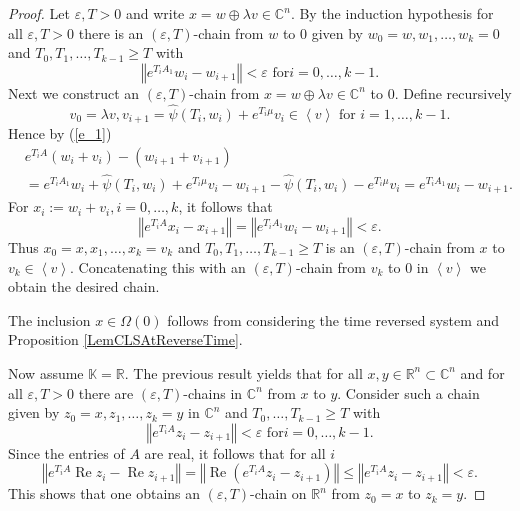 \documentclass{siamltex}%
\begin{document}
\begin{proof}
Let $\varepsilon,T>0$ and write $x=w\oplus\lambda v\in\mathbb{C}^{n}$. By the
induction hypothesis for all $\varepsilon,T>0$ there is an $(\varepsilon
,T)$-chain from $w$ to $0$ given by $w_{0}=w,w_{1},\ldots,\allowbreak w_{k}=0$
and $T_{0},T_{1},\ldots,T_{k-1}\geq T$ with%
\[
\left\Vert e^{T_{i}A_{1}}w_{i}-w_{i+1}\right\Vert <\varepsilon\text{ for
}i=0,\ldots,k-1.
\]
Next we construct an $(\varepsilon,T)$-chain from $x=w\oplus\lambda
v\in\mathbb{C}^{n}$ to $0$. Define recursively%
\[
v_{0}=\lambda v,v_{i+1}=\widehat{\psi}(T_{i},w_{i})+e^{T_{i}\mu}v_{i}%
\in\left\langle v\right\rangle \text{ for }i=1,\ldots,k-1.
\]
Hence by (\ref{e_1})%
\begin{align}
&  e^{T_{i}A}(w_{i}+v_{i})-(w_{i+1}+v_{i+1})\label{e_2}\\
&  =e^{T_{i}A_{1}}w_{i}+\widehat{\psi}(T_{i},w_{i})+e^{T_{i}\mu}v_{i}%
-w_{i+1}-\widehat{\psi}(T_{i},w_{i})-e^{T_{i}\mu}v_{i}=e^{T_{i}A_{1}}%
w_{i}-w_{i+1}.\nonumber
\end{align}
For $x_{i}:=w_{i}+v_{i},i=0,\ldots,k$, it follows that%
\[
\left\Vert e^{T_{i}A}x_{i}-x_{i+1}\right\Vert =\left\Vert e^{T_{i}A_{1}}%
w_{i}-w_{i+1}\right\Vert <\varepsilon.
\]
Thus $x_{0}=x,x_{1},\ldots,x_{k}=v_{k}$ and $T_{0},T_{1},\ldots,T_{k-1}\geq T$
is an $(\varepsilon,T)$-chain from $x$ to $v_{k}\in\left\langle v\right\rangle
$. Concatenating this with an $(\varepsilon,T)$-chain from $v_{k}$ to $0$ in
$\left\langle v\right\rangle $ we obtain the desired chain.

The inclusion $x\in\Omega(0)$ follows from considering the time reversed
system and Proposition \ref{LemCLSAtReverseTime}.

Now assume $\mathbb{K}=\mathbb{R}$. The previous result yields that for all
$x,y\in\mathbb{R}^{n}\subset\mathbb{C}^{n}$ and for all $\varepsilon,T>0$
there are $(\varepsilon,T)$-chains in $\mathbb{C}^{n}$ from $x$ to $y$.
Consider such a chain given by $z_{0}=x,z_{1},\ldots,z_{k}=y$ in
$\mathbb{C}^{n}$ and $T_{0},\ldots,T_{k-1}\geq T$ with%
\[
\left\Vert e^{T_{i}A}z_{i}-z_{i+1}\right\Vert <\varepsilon\text{ for
}i=0,\ldots,k-1.
\]
Since the entries of $A$ are real, it follows that for all $i$%
\[
\left\Vert e^{T_{i}A}\operatorname{Re}z_{i}-\operatorname{Re}z_{i+1}%
\right\Vert =\left\Vert \operatorname{Re}\left(  e^{T_{i}A}z_{i}%
-z_{i+1}\right)  \right\Vert \leq\left\Vert e^{T_{i}A}z_{i}-z_{i+1}\right\Vert
<\varepsilon.
\]
This shows that one obtains an $(\varepsilon,T)$-chain on $\mathbb{R}^{n}$
from $z_{0}=x$ to $z_{k}=y$.
\end{proof}
\end{document}
